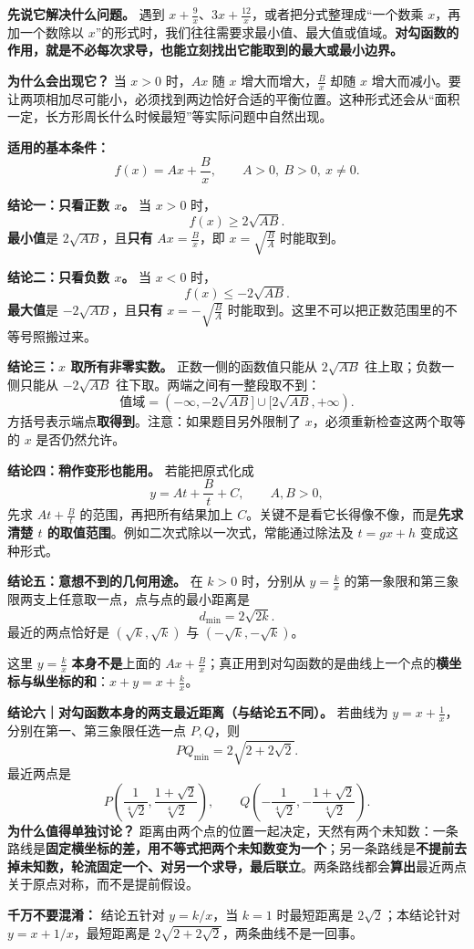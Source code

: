 \begin{statementbox}
\textbf{先说它解决什么问题。} 遇到 $x+\frac9x$、$3x+\frac{12}{x}$，或者把分式整理成“一个数乘 $x$，再加一个数除以 $x$”的形式时，我们往往需要求最小值、最大值或值域。\textbf{对勾函数的作用，就是不必每次求导，也能立刻找出它能取到的最大或最小边界。}

\medskip
\textbf{为什么会出现它？} 当 $x>0$ 时，$Ax$ 随 $x$ 增大而增大，$\frac Bx$ 却随 $x$ 增大而减小。要让两项相加尽可能小，必须找到两边恰好合适的平衡位置。这种形式还会从“面积一定，长方形周长什么时候最短”等实际问题中自然出现。

\medskip
\textbf{适用的基本条件：}
\[
\boxed{f(x)=Ax+\frac Bx,\qquad A>0,\ B>0,\ x\ne0.}
\]


\textbf{结论一：只看正数 $x$。} 当 $x>0$ 时，
\[
\boxed{f(x)\ge2\sqrt{AB}}.
\]
\textbf{最小值}是 $2\sqrt{AB}$，且\textbf{只有} $Ax=\frac Bx$，即 $x=\sqrt{\frac BA}$ 时能取到。

\medskip
\textbf{结论二：只看负数 $x$。} 当 $x<0$ 时，
\[
\boxed{f(x)\le-2\sqrt{AB}}.
\]
\textbf{最大值}是 $-2\sqrt{AB}$，且\textbf{只有} $x=-\sqrt{\frac BA}$ 时能取到。这里不可以把正数范围里的不等号照搬过来。

\medskip
\textbf{结论三：$x$ 取所有非零实数。} 正数一侧的函数值只能从 $2\sqrt{AB}$ 往上取；负数一侧只能从 $-2\sqrt{AB}$ 往下取。两端之间有一整段取不到：
\[
\boxed{\text{值域}=(-\infty,-2\sqrt{AB}]\cup[2\sqrt{AB},+\infty).}
\]
方括号表示端点\textbf{取得到}。注意：如果题目另外限制了 $x$，必须重新检查这两个取等的 $x$ 是否仍然允许。

\medskip
\textbf{结论四：稍作变形也能用。} 若能把原式化成
\[
\boxed{y=At+\frac Bt+C},\qquad A,B>0,
\]
先求 $At+\frac Bt$ 的范围，再把所有结果加上 $C$。关键不是看它长得像不像，而是\textbf{先求清楚 $t$ 的取值范围}。例如二次式除以一次式，常能通过除法及 $t=gx+h$ 变成这种形式。

\medskip
\textbf{结论五：意想不到的几何用途。} 在 $k>0$ 时，分别从 $y=\frac{k}{x}$ 的第一象限和第三象限两支上任意取一点，点与点的最小距离是
\[
\boxed{d_{\min}=2\sqrt{2k}}.
\]
最近的两点恰好是 $(\sqrt{k},\sqrt{k})$ 与 $(-\sqrt{k},-\sqrt{k})$。

这里 $y=\frac{k}{x}$ \textbf{本身不是}上面的 $Ax+\frac Bx$；真正用到对勾函数的是曲线上一个点的\textbf{横坐标与纵坐标的和}：$x+y=x+\frac{k}{x}$。


\medskip
\textbf{结论六｜对勾函数本身的两支最近距离（与结论五不同）。}
若曲线为 $y=x+\frac1x$，分别在第一、第三象限任选一点 $P,Q$，则
\[
\boxed{PQ_{\min}=2\sqrt{2+2\sqrt2}.}
\]
最近两点是
\[
\boxed{P\left(\frac1{\sqrt[4]{2}},\frac{1+\sqrt2}{\sqrt[4]{2}}\right),\qquad
Q\left(-\frac1{\sqrt[4]{2}},-\frac{1+\sqrt2}{\sqrt[4]{2}}\right).}
\]
\textbf{为什么值得单独讨论？} 距离由两个点的位置一起决定，天然有两个未知数：一条路线是\textbf{固定横坐标的差，用不等式把两个未知数变为一个}；另一条路线是\textbf{不提前去掉未知数，轮流固定一个、对另一个求导，最后联立}。两条路线都会\textbf{算出}最近两点关于原点对称，而不是提前假设。

\textbf{千万不要混淆：} 结论五针对 $y=k/x$，当 $k=1$ 时最短距离是 $2\sqrt2$；本结论针对 $y=x+1/x$，最短距离是 $2\sqrt{2+2\sqrt2}$，两条曲线不是一回事。
\end{statementbox}

